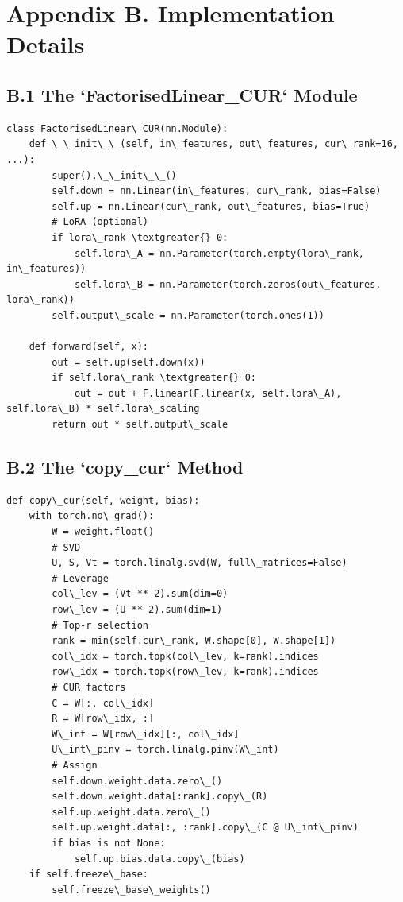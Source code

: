 
\section{Appendix B. Implementation Details}

\subsection{B.1 The `FactorisedLinear\_CUR` Module}

\begin{lstlisting}
class FactorisedLinear\_CUR(nn.Module):
    def \_\_init\_\_(self, in\_features, out\_features, cur\_rank=16, ...):
        super().\_\_init\_\_()
        self.down = nn.Linear(in\_features, cur\_rank, bias=False)
        self.up = nn.Linear(cur\_rank, out\_features, bias=True)
        # LoRA (optional)
        if lora\_rank \textgreater{} 0:
            self.lora\_A = nn.Parameter(torch.empty(lora\_rank, in\_features))
            self.lora\_B = nn.Parameter(torch.zeros(out\_features, lora\_rank))
        self.output\_scale = nn.Parameter(torch.ones(1))
    
    def forward(self, x):
        out = self.up(self.down(x))
        if self.lora\_rank \textgreater{} 0:
            out = out + F.linear(F.linear(x, self.lora\_A), self.lora\_B) * self.lora\_scaling
        return out * self.output\_scale
\end{lstlisting}

\subsection{B.2 The `copy\_cur` Method}

\begin{lstlisting}
def copy\_cur(self, weight, bias):
    with torch.no\_grad():
        W = weight.float()
        # SVD
        U, S, Vt = torch.linalg.svd(W, full\_matrices=False)
        # Leverage
        col\_lev = (Vt ** 2).sum(dim=0)
        row\_lev = (U ** 2).sum(dim=1)
        # Top-r selection
        rank = min(self.cur\_rank, W.shape[0], W.shape[1])
        col\_idx = torch.topk(col\_lev, k=rank).indices
        row\_idx = torch.topk(row\_lev, k=rank).indices
        # CUR factors
        C = W[:, col\_idx]
        R = W[row\_idx, :]
        W\_int = W[row\_idx][:, col\_idx]
        U\_int\_pinv = torch.linalg.pinv(W\_int)
        # Assign
        self.down.weight.data.zero\_()
        self.down.weight.data[:rank].copy\_(R)
        self.up.weight.data.zero\_()
        self.up.weight.data[:, :rank].copy\_(C @ U\_int\_pinv)
        if bias is not None:
            self.up.bias.data.copy\_(bias)
    if self.freeze\_base:
        self.freeze\_base\_weights()
\end{lstlisting}

